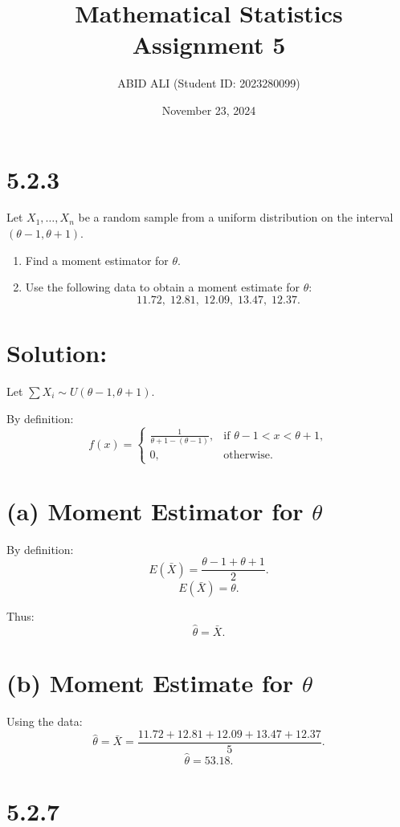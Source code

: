 \documentclass{article}
\title{Mathematical Statistics Assignment 5}
\author{ABID ALI (Student ID: 2023280099)}
\date{November 23, 2024}
\begin{document}
\maketitle

\newpage %

\section*{5.2.3}

Let $X_1, \dots, X_n$ be a random sample from a uniform distribution on the interval $(\theta - 1, \theta + 1)$.

\begin{enumerate}
    \item[(a)] Find a moment estimator for $\theta$.
    \item[(b)] Use the following data to obtain a moment estimate for $\theta$:
    \[
    11.72, \; 12.81, \; 12.09, \; 13.47, \; 12.37.
    \]
\end{enumerate}

\section*{Solution:}

Let $\sum X_i \sim U(\theta - 1, \theta + 1)$.

By definition:
\[
f(x) = 
\begin{cases} 
\frac{1}{\theta + 1 - (\theta - 1)}, & \text{if } \theta - 1 < x < \theta + 1, \\
0, & \text{otherwise}.
\end{cases}
\]

\section*{(a) Moment Estimator for $\theta$}
By definition:
\[
E(\bar{X}) = \frac{\theta - 1 + \theta + 1}{2}.
\]
\[
E(\bar{X}) = \theta.
\]

Thus:
\[
\hat{\theta} = \bar{X}.
\]

\section*{(b) Moment Estimate for $\theta$}
Using the data:
\[
\hat{\theta} = \bar{X} = \frac{11.72 + 12.81 + 12.09 + 13.47 + 12.37}{5}.
\]
\[
\hat{\theta} = 53.18.
\]


\section*{5.2.7}
\end{document}
